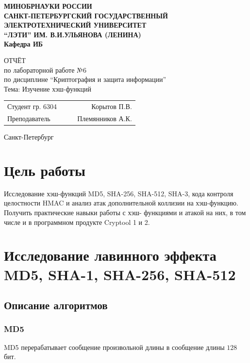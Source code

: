 \documentclass[a4paper, 14pt]{extarticle}
\begin{document}
\begin{titlepage}
    \centering
    {\bfseries
        \uppercase{
            Минобрнауки России \\
            Санкт-Петербургский государственный \\
            Электротехнический университет \\
            \enquote{ЛЭТИ} им. В.И.Ульянова (Ленина)\\
        }
        Кафедра ИБ

        \vspace{\fill}
        \uppercase{Отчёт} \\
        по лабораторной работе №6 \\
        по дисциплине \enquote{Криптография и защита информации} \\
        Тема: Изучение хэш-функций
    }

    \vspace{\fill}
    \begin{tabularx}{0.8\textwidth}{l X c r}
        Студент гр. 6304 & & \underline{\hspace{3cm}} & Корытов П.В.\\
        Преподаватель & & \underline{\hspace{3cm}} & Племянников А.К.
    \end{tabularx}

    \vspace{1cm}
    Санкт-Петербург \\
    \the\year{}
\end{titlepage}

\section*{Цель работы}
Исследование хэш-функций MD5, SHA-256, SHA-512, SHA-3, кода контроля целостности HMAC и анализ атак дополнительной коллизии на хэш-функцию. Получить практические навыки работы с хэш- функциями и атакой на них, в том числе и в программном продукте Cryptool 1 и 2.

\section{Исследование лавинного эффекта MD5, SHA-1, SHA-256, SHA-512}
\subsection{Описание алгоритмов}
\subsubsection{MD5}
MD5 перерабатывает сообщение произвольной длины в сообщение длины $128$ бит.
\end{document}
